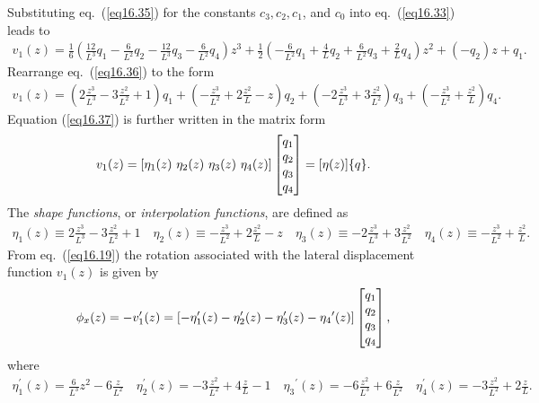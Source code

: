 \documentclass{AeroStructure-ERJohnson}
\begin{document}
Substituting eq.~(\ref{eq16.35}) for the constants $c_{3}, c_{2}, c_{1}$, and $c_{0}$ into eq.~(\ref{eq16.33}) leads to
\begin{align}\label{eq16.36}
v_{1}(z)=\frac{1}{6}\left(\frac{12}{L^{3}} q_{1}-\frac{6}{L^{2}} q_{2}-\frac{12}{L^{3}} q_{3}-\frac{6}{L^{2}} q_{4}\right) z^{3}+\frac{1}{2}\left(-\frac{6}{L^{2}} q_{1}+\frac{4}{L} q_{2}+\frac{6}{L^{2}} q_{3}+\frac{2}{L} q_{4}\right) z^{2}+\left(-q_{2}\right) z+q_{1}.
\end{align}
Rearrange eq.~(\ref{eq16.36}) to the form
\begin{align}\label{eq16.37}
v_{1}(z)=\left(2 \frac{z^{3}}{L^{3}}-3 \frac{z^{2}}{L^{2}}+1\right) q_{1}+\left(-\frac{z^{3}}{L^{2}}+2 \frac{z^{2}}{L}-z\right) q_{2}+\left(-2 \frac{z^{3}}{L^{3}}+3 \frac{z^{2}}{L^{2}}\right) q_{3}+\left(-\frac{z^{3}}{L^{2}}+\frac{z^{2}}{L}\right) q_{4}.
\end{align}
Equation (\ref{eq16.37}) is further written in the matrix form
\begin{align}\label{eq16.38}
v_{1}(z)=\left[\eta_{1}(z)\ \eta_{2}(z)\ \eta_{3}(z)\ \eta_{4}(z)\right]\left[\begin{array}{@{}l@{}}q_{1} \\q_{2} \\q_{3} \\q_{4}\end{array}\right]=[\eta(z)]\{q\}.
\end{align}
The \textit{shape functions}, or \textit{interpolation functions}, are defined as
\begin{align}\label{eq16.39}
\eta_{1}(z) \equiv 2 \frac{z^{3}}{L^{3}}-3 \frac{z^{2}}{L^{2}}+1 \quad \eta_{2}(z) \equiv-\frac{z^{3}}{L^{2}}+2 \frac{z^{2}}{L}-z \quad \eta_{3}(z) \equiv-2 \frac{z^{3}}{L^{3}}+3 \frac{z^{2}}{L^{2}} \quad \eta_{4}(z) \equiv-\frac{z^{3}}{L^{2}}+\frac{z^{2}}{L}.
\end{align}
From eq.~(\ref{eq16.19}) the rotation associated with the lateral displacement function $v_{1}(z)$ is given by
\begin{align}\label{eq16.40}
\phi_{x}(z)=-v_{1}^{\prime}(z)=\left[-\eta_{1}^{\prime}(z)-\eta_{2}^{\prime}(z)-\eta_{3}^{\prime}(z)-\eta_{4}{ }^{\prime}(z)\right]\left[\begin{array}{@{}l@{}}q_{1} \\q_{2} \\q_{3} \\q_{4}\end{array}\right],
\end{align}
where
\begin{align}\label{eq16.41}
\eta_{1}^{\prime}(z)=\frac{6}{L^{3}} z^{2}-6 \frac{z}{L^{2}} \quad \eta_{2}^{\prime}(z)=-3 \frac{z^{2}}{L^{2}}+4 \frac{z}{L}-1 \quad \eta_{3}{ }^{\prime}(z)=-6 \frac{z^{2}}{L^{3}}+6 \frac{z}{L^{2}} \quad \eta_{4}^{\prime}(z)=-3 \frac{z^{2}}{L^{2}}+2 \frac{z}{L}.
\end{align}
\end{document}
